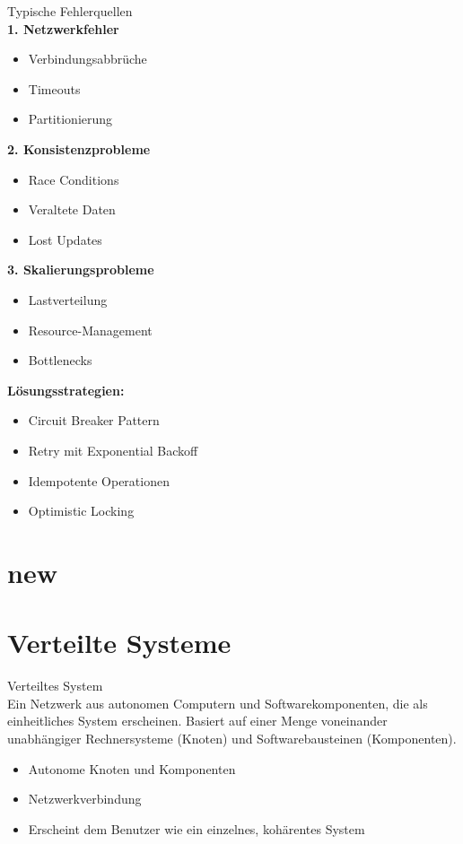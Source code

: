 \begin{KR}{Typische Fehlerquellen}\\
\textbf{1. Netzwerkfehler}
\begin{itemize}
    \item Verbindungsabbrüche
    \item Timeouts
    \item Partitionierung
\end{itemize}

\textbf{2. Konsistenzprobleme}
\begin{itemize}
    \item Race Conditions
    \item Veraltete Daten
    \item Lost Updates
\end{itemize}

\textbf{3. Skalierungsprobleme}
\begin{itemize}
    \item Lastverteilung
    \item Resource-Management
    \item Bottlenecks
\end{itemize}

\textbf{Lösungsstrategien:}
\begin{itemize}
    \item Circuit Breaker Pattern
    \item Retry mit Exponential Backoff
    \item Idempotente Operationen
    \item Optimistic Locking
\end{itemize}
\end{KR}

\pagebreak

\section{new}

\section{Verteilte Systeme}

\begin{definition}{Verteiltes System}\\
Ein Netzwerk aus autonomen Computern und Softwarekomponenten, die als einheitliches System erscheinen. Basiert auf einer Menge voneinander unabhängiger Rechnersysteme (Knoten) und Softwarebausteinen (Komponenten).
\begin{itemize}
    \item Autonome Knoten und Komponenten
    \item Netzwerkverbindung
    \item Erscheint dem Benutzer wie ein einzelnes, kohärentes System
\end{itemize}
\end{definition}

